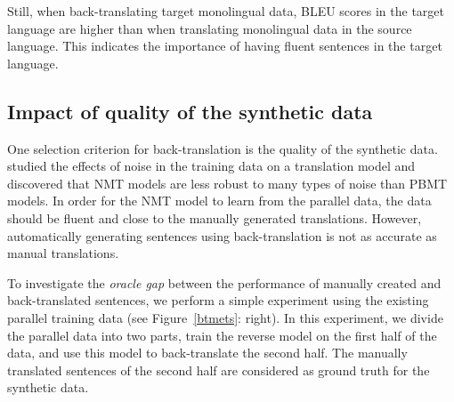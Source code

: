 Still, when back-translating target monolingual data, BLEU scores in the target language are higher than when translating monolingual data in the source language. 
This indicates the importance of having fluent sentences in the target language.



\subsection{Impact of quality of the synthetic data}

One selection criterion for back-translation is the quality of the synthetic data.
\citet{W18-2709} studied the effects of noise in the training data on a translation model and discovered that NMT models are less robust to many types of noise than PBMT models.
In order for the NMT model to learn from the parallel data, the data should be fluent and close to the manually generated translations.
However, automatically generating sentences using back-translation is not as accurate as manual translations. 


To investigate the \textit{oracle gap} between the performance of manually created and back-translated sentences, we perform a simple experiment using the existing parallel training data (see Figure~\ref{btmets}: right).
In this experiment, we divide the parallel data into two parts, train the reverse model on the first half of the data, and use this model to back-translate the second half.
The manually translated sentences of the second half are considered as ground truth for the synthetic data.

